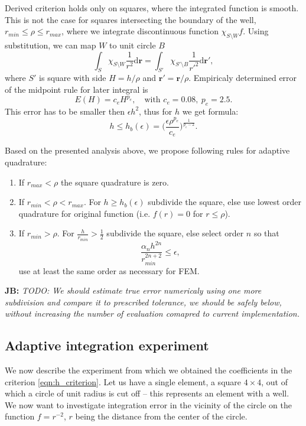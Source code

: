 \documentclass[preprint,12pt]{elsarticle}
\def\vc#1{\mathbf{\boldsymbol{#1}}}     %
\def\d{\mathrm{d}}
\newcommand{\noteJB}[1]{{\color{Blue} \textbf{JB: } \textit{#1}}}
\begin{document}
Derived criterion holds only on squares, where the integrated function is smooth.
This is not the case for squares intersecting the boundary of the well, $r_{min} \le \rho \le r_{max}$, where we integrate 
discontinuous function $\chi_{S \setminus W} f$. Using substitution, we can map $W$ to unit circle $B$
\[
  \int_{S} \chi_{S \setminus W} \frac{1}{r^2} \d \vc r= \int_{S'} \chi_{S' \setminus B} \frac{1}{r'^2} \d \vc {r'},
\]
where $S'$ is square with side $H=h/\rho$ and $\vc {r'} = \vc{r}/\rho$. Empiricaly determined error of the midpoint rule for later 
integral is
\[
    E(H) = c_e H^{p_e}, \quad \text{with } c_e=0.08,\ p_e=2.5.
\]
This error has to be smaller then $\epsilon h^2$, thus for $h$ we get formula:
\begin{equation} \label{eqn:h_criterion}
   h\le h_b(\epsilon) = \Big(\frac{\epsilon \rho^{p_e}}{c_e}\Big)^{\frac{1}{p_e-2}}. 
\end{equation}


Based on the presented analysis above, we propose following rules for adaptive quadrature:
\begin{enumerate}
 \item If $r_{max} < \rho$ the square quadrature is zero.
 \item If $r_{min} < \rho < r_{max}$. For $h \ge h_b(\epsilon)$ subdivide the square, else use lowest order quadrature for 
original function (i.e. $f(r)=0$ for $r\le \rho$).
 \item If $r_{min} > \rho$. For $\frac{h}{r_{min}} > \frac{1}{2}$ subdivide the square, else select order $n$ so that 
 \begin{equation} \label{eqn:alpha_criterion}
    \frac{\alpha_n h^{2n}}{r_{min}^{2n+2}} \le \epsilon,
 \end{equation}
 use at least the same order as necessary for FEM.
\end{enumerate}

\noteJB{TODO:
We should estimate true error numericaly using one more subdivision and compare it to prescribed tolerance, we should be safely 
below, without increasing the number of evaluation comapred to current implementation.
}


\subsection{Adaptive integration experiment}
We now describe the experiment from which we obtained the coefficients in the criterion 
\eqref{eqn:h_criterion}. Let us have a single element, a square $4\times4$, out of which a circle of unit radius 
is cut off -- this represents an element with a well. We now want to investigate integration error
in the vicinity of the circle on the function $f=r^{-2}$, $r$ being the distance from the center of the circle. 
\end{document}

